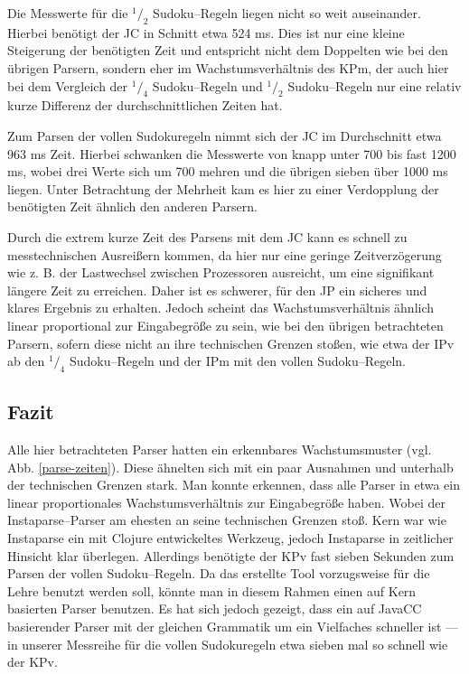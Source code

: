 \documentclass[ngerman,a4paper,abstracton,open=right,twoside=false,toc=listofnumbered,bibtotocnumbered]{scrreprt}
\begin{document}
Die Messwerte für die $^1/_2$ Sudoku--Regeln liegen nicht so weit auseinander. Hierbei benötigt der JC in Schnitt etwa 524 ms. Dies ist nur eine kleine Steigerung der benötigten Zeit und entspricht nicht dem Doppelten wie bei den übrigen Parsern, sondern eher im Wachstumsverhältnis des KPm, der auch hier bei dem Vergleich der $^1/_4$ Sudoku--Regeln und $^1/_2$ Sudoku--Regeln nur eine relativ kurze Differenz der durchschnittlichen Zeiten hat.

Zum Parsen der vollen Sudokuregeln nimmt sich der JC im Durchschnitt etwa 963 ms Zeit. Hierbei schwanken die Messwerte von knapp unter 700 bis fast 1200 ms, wobei drei Werte sich um 700 mehren und die übrigen sieben über 1000 ms liegen. Unter Betrachtung der Mehrheit kam es hier zu einer Verdopplung der benötigten Zeit ähnlich den anderen Parsern.\\

\newpage

Durch die extrem kurze Zeit des Parsens mit dem JC kann es schnell zu messtechnischen Ausreißern kommen, da hier nur eine geringe Zeitverzögerung wie z. B. der Lastwechsel zwischen Prozessoren ausreicht, um eine signifikant längere Zeit zu erreichen. Daher ist es schwerer, für den JP ein sicheres und klares Ergebnis zu erhalten. Jedoch scheint das Wachstumsverhältnis ähnlich linear proportional zur Eingabegröße zu sein, wie bei den übrigen betrachteten Parsern, sofern diese nicht an ihre technischen Grenzen stoßen, wie etwa der IPv ab den $^1/_4$ Sudoku--Regeln und der IPm mit den vollen Sudoku--Regeln.

\subsection{Fazit}

Alle hier betrachteten Parser hatten ein erkennbares Wachstumsmuster (vgl. Abb. \ref{parse-zeiten}). Diese ähnelten sich mit ein paar Ausnahmen und unterhalb der technischen Grenzen stark. Man konnte erkennen, dass alle Parser in etwa ein linear proportionales Wachstumsverhältnis zur Eingabegröße haben. Wobei der Instaparse--Parser am ehesten an seine technischen Grenzen stoß. Kern war wie Instaparse ein mit Clojure entwickeltes Werkzeug, jedoch Instaparse in zeitlicher Hinsicht klar überlegen. Allerdings benötigte der KPv fast sieben Sekunden zum Parsen der vollen Sudoku--Regeln. Da das erstellte Tool vorzugsweise für die Lehre benutzt werden soll, könnte man in diesem Rahmen einen auf Kern basierten Parser benutzen. Es hat sich jedoch gezeigt, dass ein auf JavaCC basierender Parser mit der gleichen Grammatik um ein Vielfaches schneller ist --- in unserer Messreihe für die vollen Sudokuregeln etwa sieben mal so schnell wie der KPv.
\end{document}
